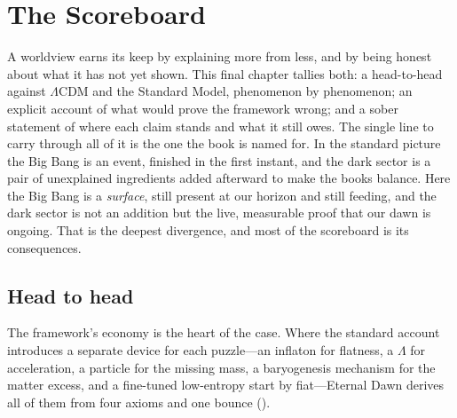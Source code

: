 \chapter{The Scoreboard}
\label{chap:scoreboard}

A worldview earns its keep by explaining more from less, and by being honest about
what it has not yet shown. This final chapter tallies both: a head-to-head against
$\Lambda$CDM and the Standard Model, phenomenon by phenomenon; an explicit account
of what would prove the framework wrong; and a sober statement of where each claim
stands and what it still owes. The single line to carry through all of it is the
one the book is named for. In the standard picture the Big Bang is an event,
finished in the first instant, and the dark sector is a pair of unexplained
ingredients added afterward to make the books balance. Here the Big Bang is a
\emph{surface}, still present at our horizon and still feeding, and the dark sector
is not an addition but the live, measurable proof that our dawn is ongoing. That is
the deepest divergence, and most of the scoreboard is its consequences.

\section{Head to head}

The framework's economy is the heart of the case. Where the standard account
introduces a separate device for each puzzle---an inflaton for flatness, a
$\Lambda$ for acceleration, a particle for the missing mass, a baryogenesis
mechanism for the matter excess, and a fine-tuned low-entropy start by
fiat---Eternal Dawn derives all of them from four axioms and one bounce
().


